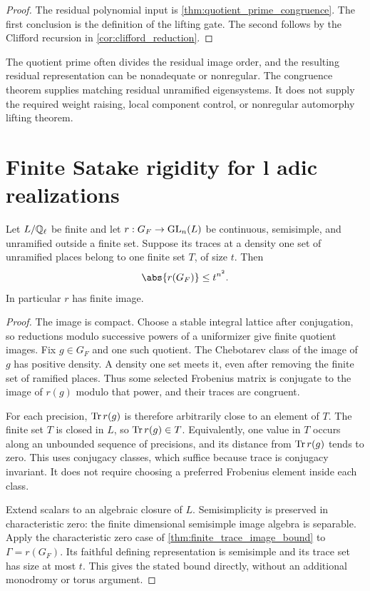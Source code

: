 \begin{proof}
The residual polynomial input is \cref{thm:quotient_prime_congruence}. The first conclusion is the definition of the lifting gate. The second follows by the Clifford recursion in \cref{cor:clifford_reduction}.
\end{proof}

\begin{remark}\label{rem:quotient_prime_difficulty}
The quotient prime often divides the residual image order, and the resulting residual representation can be nonadequate or nonregular. The congruence theorem supplies matching residual unramified eigensystems. It does not supply the required weight raising, local component control, or nonregular automorphy lifting theorem.
\end{remark}

\section{Finite Satake rigidity for l adic realizations}\label{sec:ladic_rigidity}

\begin{theorem}\label{thm:finite_trace_ladic_rigidity}
Let \(L/\mathbb Q_\ell\) be finite and let \(r:G_F\to\operatorname{GL}_n(L)\) be continuous, semisimple, and unramified outside a finite set. Suppose its traces at a density one set of unramified places belong to one finite set \(T\), of size \(t\). Then
\[
 \abs{r(G_F)}\le t^{n^2}.
\]
In particular \(r\) has finite image.
\end{theorem}

\begin{proof}
The image is compact. Choose a stable integral lattice after conjugation, so reductions modulo successive powers of a uniformizer give finite quotient images. Fix \(g\in G_F\) and one such quotient. The Chebotarev class of the image of \(g\) has positive density. A density one set meets it, even after removing the finite set of ramified places. Thus some selected Frobenius matrix is conjugate to the image of \(r(g)\) modulo that power, and their traces are congruent.

For each precision, \(\operatorname{Tr} r(g)\) is therefore arbitrarily close to an element of \(T\). The finite set \(T\) is closed in \(L\), so \(\operatorname{Tr} r(g)\in T\). Equivalently, one value in \(T\) occurs along an unbounded sequence of precisions, and its distance from \(\operatorname{Tr} r(g)\) tends to zero. This uses conjugacy classes, which suffice because trace is conjugacy invariant. It does not require choosing a preferred Frobenius element inside each class.

Extend scalars to an algebraic closure of \(L\). Semisimplicity is preserved in characteristic zero: the finite dimensional semisimple image algebra is separable. Apply the characteristic zero case of \cref{thm:finite_trace_image_bound} to \(\Gamma=r(G_F)\). Its faithful defining representation is semisimple and its trace set has size at most \(t\). This gives the stated bound directly, without an additional monodromy or torus argument.
\end{proof}

